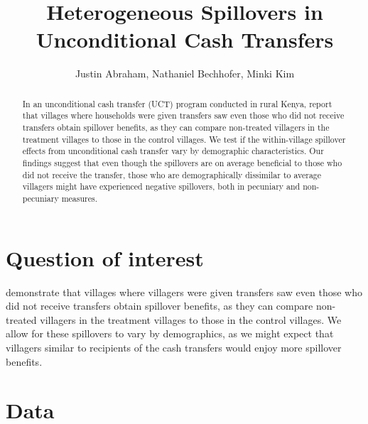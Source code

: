 \documentclass[11pt]{article}
\begin{document}
\title{Heterogeneous Spillovers in Unconditional Cash Transfers}

\author{
	Justin Abraham, Nathaniel Bechhofer, Minki Kim
}

\maketitle

	\begin{abstract}

		In an unconditional cash transfer (UCT) program conducted in rural Kenya, \textcite{haushofer_short-term_2016} report that villages where households were given transfers saw even those who did not receive transfers obtain spillover benefits, as they can compare non-treated villagers in the treatment villages to those in the control villages. We test if the within-village spillover effects from unconditional cash transfer vary by demographic characteristics. Our findings suggest that even though the spillovers are on average beneficial to those who did not receive the transfer, those who are demographically dissimilar to average villagers might have experienced negative spillovers, both in pecuniary and non-pecuniary measures.

 	\end{abstract}

\newpage

\section{Question of interest}

    \textcite{haushofer_short-term_2016} demonstrate that villages where villagers were given transfers saw even those who did not receive transfers obtain spillover benefits, as they can compare non-treated villagers in the treatment villages to those in the control villages. We allow for these spillovers to vary by demographics, as we might expect that villagers similar to recipients of the cash transfers would enjoy more spillover benefits.


\section{Data}
\end{document}
